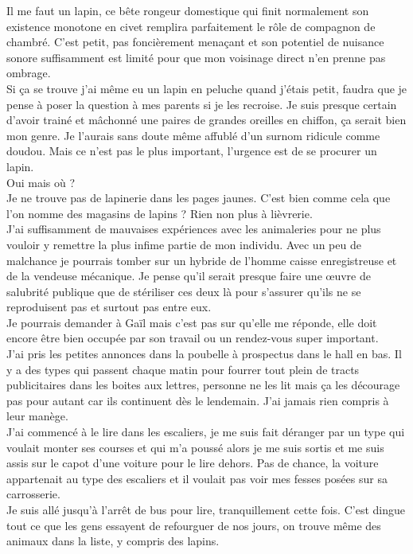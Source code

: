 Il me faut un lapin, ce bête rongeur domestique qui finit normalement son existence monotone en civet remplira parfaitement le rôle de compagnon de chambré. C'est petit, pas foncièrement menaçant et son potentiel de nuisance sonore suffisamment est limité pour que mon voisinage direct n'en prenne pas ombrage. \\
Si ça se trouve j'ai même eu un lapin en peluche quand j'étais petit, faudra que je pense à poser la question à mes parents si je les recroise. Je suis presque certain d'avoir trainé et mâchonné une paires de grandes oreilles en chiffon, ça serait bien mon genre. Je l'aurais sans doute même affublé d'un surnom ridicule comme doudou. Mais ce n'est pas le plus important, l'urgence est de se procurer un lapin. \\

Oui mais où ? \\

Je ne trouve pas de lapinerie dans les pages jaunes. C'est bien comme cela que l'on nomme des magasins de lapins ? Rien non plus à lièvrerie. \\

J'ai suffisamment de mauvaises expériences avec les animaleries pour ne plus vouloir y remettre la plus infime partie de mon individu. Avec un peu de malchance je pourrais tomber sur un hybride de l'homme caisse enregistreuse et de la vendeuse mécanique. Je pense qu'il serait presque faire une œuvre de salubrité publique que de stériliser ces deux là pour s'assurer qu'ils ne se reproduisent pas et surtout pas entre eux. \\
Je pourrais demander à Gaïl mais c'est pas sur qu'elle me réponde, elle doit encore être bien occupée par son travail ou un rendez-vous super important. \\

J'ai pris les petites annonces dans la poubelle à prospectus dans le hall en bas. Il y a des types qui passent chaque matin pour fourrer tout plein de tracts publicitaires dans les boites aux lettres, personne ne les lit mais ça les décourage pas pour autant car ils continuent dès le lendemain. J'ai jamais rien compris à leur manège.\\

J'ai commencé à le lire dans les escaliers, je me suis fait déranger par un type qui voulait monter ses courses et qui m'a poussé alors je me suis sortis et me suis assis sur le capot d'une voiture pour le lire dehors. Pas de chance, la voiture appartenait au type des escaliers et il voulait pas voir mes fesses posées sur sa carrosserie. \\
Je suis allé jusqu'à l'arrêt de bus pour lire, tranquillement cette fois. C'est dingue tout ce que les gens essayent de refourguer de nos jours, on trouve même des animaux dans la liste, y compris des lapins. \\

